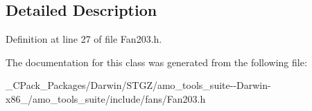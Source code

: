 \subsection{Detailed Description}


Definition at line 27 of file Fan203.\+h.



The documentation for this class was generated from the following file\+:\begin{DoxyCompactItemize}
\item 
\+\_\+\+C\+Pack\+\_\+\+Packages/\+Darwin/\+S\+T\+G\+Z/amo\+\_\+tools\+\_\+suite-\/-\/\+Darwin-\/x86\+\_/amo\+\_\+tools\+\_\+suite/include/fans/Fan203.\+h\end{DoxyCompactItemize}
